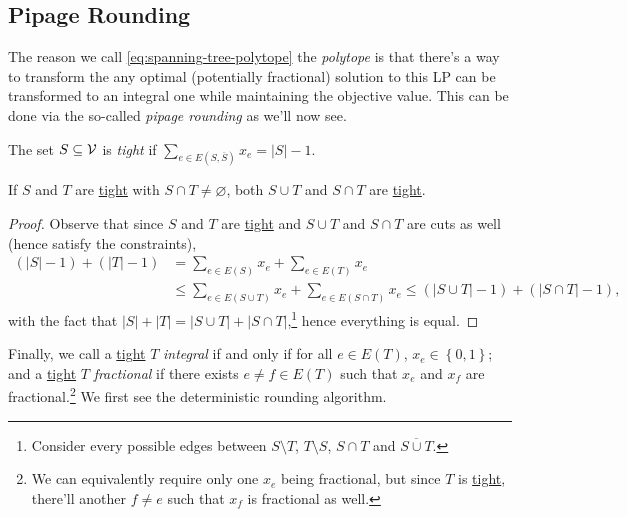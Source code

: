 \subsection{Pipage Rounding}
The reason we call \autoref{eq:spanning-tree-polytope} the \emph{polytope} is that there's a way to transform the any optimal (potentially fractional) solution to this LP can be transformed to an integral one while maintaining the objective value. This can be done via the so-called \emph{pipage rounding} as we'll now see.

\begin{notation}[Tight]\label{not:tight}
	The set \(S\subseteq \mathcal{\MakeUppercase{v}} \) is \emph{tight} if \(\sum_{e\in E(S, \overline{S})} x_e = \left\vert S \right\vert - 1 \).
\end{notation}

\begin{lemma}[Uncrossing]\label{lma:uncrossing}
	If \(S\) and \(T\) are \hyperref[not:tight]{\hyperref[not:tight]{tight}} with \(S \cap T \neq \varnothing \), both \(S \cup T\) and \(S \cap T\) are \hyperref[not:tight]{tight}.
\end{lemma}
\begin{proof}
	Observe that since \(S\) and \(T\) are \hyperref[not:tight]{tight} and \(S\cup T\) and \(S \cap T\) are cuts as well (hence satisfy the constraints),
	\[
		\begin{split}
			(\left\vert S \right\vert - 1) + (\left\vert T \right\vert - 1)
			&= \sum_{e\in E(S)}x_e + \sum_{e\in E(T)} x_e\\
			&\leq \sum_{e\in E(S \cup T)}x_e  + \sum_{e\in E (S \cap T)} x_e
			\leq (\left\vert S \cup T \right\vert - 1) + ( \left\vert S \cap T \right\vert - 1),
		\end{split}
	\]
	with the fact that \(\left\vert S \right\vert + \left\vert T \right\vert = \left\vert S \cup T \right\vert + \left\vert S \cap T \right\vert\),\footnote{Consider every possible edges between \(S\setminus T\), \(T\setminus S\), \(S \cap T\) and \(\overline{S \cup T}\).} hence everything is equal.
\end{proof}

Finally, we call a \hyperref[not:tight]{tight} \(T\) \emph{integral} if and only if for all \(e\in E(T)\), \(x_e\in \left\{ 0, 1 \right\} \); and a \hyperref[not:tight]{tight} \(T\) \emph{fractional} if there exists \(e \neq f\in E(T)\) such that \(x_e\) and \(x_f\) are fractional.\footnote{We can equivalently require only one \(x_e\) being fractional, but since \(T\) is \hyperref[not:tight]{tight}, there'll another \(f \neq e\) such that \(x_f\) is fractional as well.} We first see the deterministic rounding algorithm.

